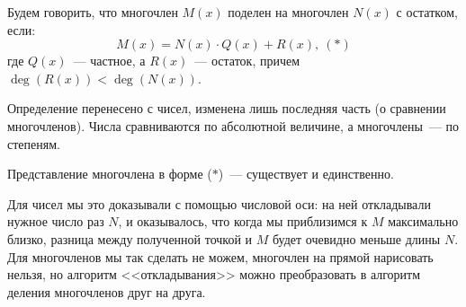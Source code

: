 \documentclass[russian]{lecture-notes}
\theoremstyle{definition}
\DeclareMathOperator{\Deg}{deg}
\newcommand{\D}[1]{\Deg(#1)}
\begin{document}
	\begin{definition}
		Будем говорить, что многочлен $M(x)$ поделен на многочлен $N(x)$ с остатком, если:
		\[
			M(x) = N(x) \cdot Q(x) + R(x), \ (\ast)
		\] 
		где $Q(x)$~--- частное, а $R(x)$~--- остаток, причем $\D{R(x)} < \D{N(x)}$.
	\end{definition}

	\begin{note}
		Определение перенесено с чисел, изменена лишь последняя часть (о сравнении многочленов). Числа сравниваются по абсолютной величине, а многочлены~--- по степеням.
	\end{note}

	\begin{theorem}
		Представление многочлена в форме ($\ast$)~--- существует и единственно.
	\end{theorem}

	\begin{note}
		Для чисел мы это доказывали с помощью числовой оси: на ней откладывали нужное число раз $N$, и оказывалось, что когда мы приблизимся к $M$ максимально близко, разница между полученной точкой и $M$ будет очевидно меньше длины $N$. Для многочленов мы так сделать не можем, многочлен на прямой нарисовать нельзя, но алгоритм <<откладывания>> можно преобразовать в алгоритм деления многочленов друг на друга.
	\end{note}
\end{document}
